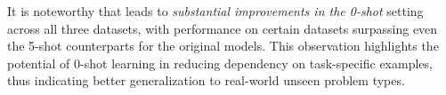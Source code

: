 It is noteworthy that {\langname} leads to \emph{substantial improvements in the 0-shot} setting across all three datasets, with performance on certain datasets surpassing even the 5-shot counterparts for the original models. This observation highlights the potential of 0-shot learning in reducing dependency on task-specific examples, thus indicating better generalization to real-world unseen problem types.




